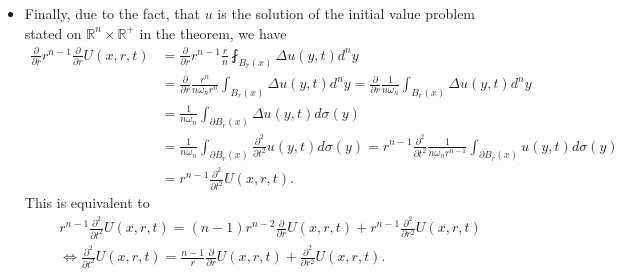 \documentclass[A4,12pt,twoside]{book}
\begin{document}
{\begin{itemize}
\begin{align*}
        &= \left( \frac{1}{n} -1  \right) \fint_{ B_r (x)}  \Delta u (y,t) d^n y + \fint_{ \partial B_r (x)} \Delta u (y,t) d \sigma(y).
    \end{align*}
    And in the limit we have 
    \begin{align*}
    &\lim_{r \to 0 }  \frac{\partial^2}{\partial r^2} U(x,r,t) = \lim_{r \to 0 } \left( \left( \frac{1}{n} -1  \right) \fint_{ B_r (x)}  \Delta u (y,t) d^n y + \fint_{ \partial B_r (x)} \Delta u (y,t) d \sigma(y) \right) \\
    &= \left( \frac{1}{n} -1 \right) \Delta u (x,t) + \Delta u (x,t) = \frac{1}{n} \Delta u (x,t),
    \end{align*}
    which exists.
    \item Finally, due to the fact, that $u$ is the solution of the initial value problem stated on $\mathbb{R}^n \times \mathbb{R}^+$ in the theorem, we have 
    \begin{align*}
        \frac{\partial }{\partial r} r^{n-1} \frac{\partial}{\partial r} U(x,r,t) &= \frac{\partial }{\partial r} r^{n-1} \frac{r}{n} \fint_{B_r (x)} \Delta u(y,t) d^n y\\
        &=\frac{\partial }{\partial r} \frac{r^n}{n\omega_n r^n} \int_{B_r (x)} \Delta u(y,t) d^n y = \frac{\partial }{\partial r} \frac{1}{n\omega_n } \int_{B_r (x)} \Delta u(y,t) d^n y \\
        &=  \frac{1}{n\omega_n } \int_{\partial B_r (x)} \Delta u(y,t) d  \sigma(y ) \\
        &= \frac{1}{n\omega_n } \int_{\partial B_r (x)} \frac{\partial^2}{\partial t^2} u(y,t) d  \sigma(y ) = r^{n-1}\frac{\partial^2}{\partial t^2}  \frac{1}{n\omega_n r^{n-1} } \int_{\partial B_r (x)}  u(y,t) d  \sigma(y )\\
        &= r^{n-1} \frac{\partial^2}{\partial t^2} U(x,r,t).
    \end{align*}
    This is equivalent to
    \begin{align*}
       & r^{n-1} \frac{\partial^2}{\partial t^2} U(x,r,t) = (n-1) r^{n-2} \frac{\partial}{\partial r} U(x,r,t) + r^{n-1} \frac{\partial^2}{\partial r^2} U(x,r,t) \\
        &\iff \frac{\partial^2}{\partial t^2} U(x,r,t) = \frac{n-1}{r} \frac{\partial}{\partial r} U(x,r,t) + \frac{\partial^2}{\partial r^2} U(x,r,t).
    \end{align*}
    \end{itemize}
     
  

}
\end{document}
